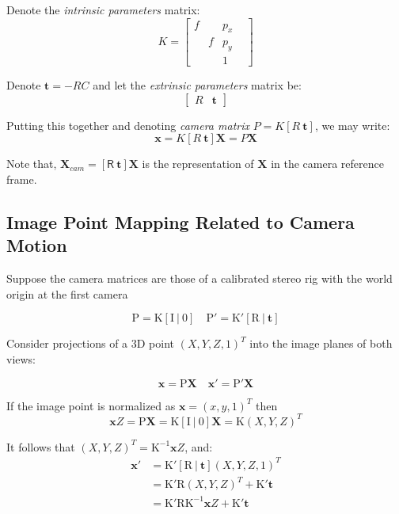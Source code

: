 \documentclass[runningheads]{llncs}
\begin{document}
Denote the \emph{intrinsic parameters} matrix:
\begin{equation}
\label{eq:intrinsic}
K=\begin{bmatrix} f & & p_x & \\ & f & p_y & \\ & & 1 & \end{bmatrix}
\end{equation}

Denote $\mathbf{t} = -RC$ and let the \emph{extrinsic parameters}
matrix be:
\begin{equation}
\begin{bmatrix}
R & \mathbf{t}
\end{bmatrix}
\end{equation}

Putting this together and denoting \emph{camera matrix}
$P=K[R\ \mathbf{t}]$, we may write:
\begin{equation}
\mathbf{x} = K[R\ \mathbf{t}]\mathbf{X} = P\mathbf{X}
\end{equation}

Note that, $ \mathbf{X}_{cam}= [\mathsf{R}\ \mathbf{t}]\mathbf{X}$ is the
representation of $\mathbf{X}$ in the camera reference frame.

\subsection{Image Point Mapping Related to Camera Motion}

Suppose the camera matrices are those of a calibrated stereo rig with
the world origin at the first camera

\[
\mathrm{P = K[I\ |\ 0]\quad P'=K'[R\ |\ \mathbf{t}]}
\]

Consider projections of a 3D point $(X,Y,Z,1)^T$ into the image planes of both views:

\[
\mathrm{\mathbf{x} = P\mathbf{X} \quad \mathbf{x}' = P'\mathbf{X}}
\]

If the image point is normalized as $\mathbf{x} = (x,y,1)^T$ then
\[
\mathbf{x}Z = \mathrm{P\mathbf{X} = K[I\ |\ 0]\mathbf{X} = K}(X,Y,Z)^T
\]

It follows that $(X,Y,Z)^T = \mathrm{K^{-1}}\mathbf{x}Z$, and:
\begin{align}
  \mathbf{x}' &= \mathrm{K'[R\ |\ \mathbf{t}]}(X,Y,Z,1)^T \\
  &= \mathrm{K'R}(X,Y,Z)^T + \mathrm{K'\mathbf{t}}\\
  &= \mathrm{K'RK^{-1}}\mathbf{x}Z + \mathrm{K'\mathbf{t}}\\
\end{align}
\end{document}
